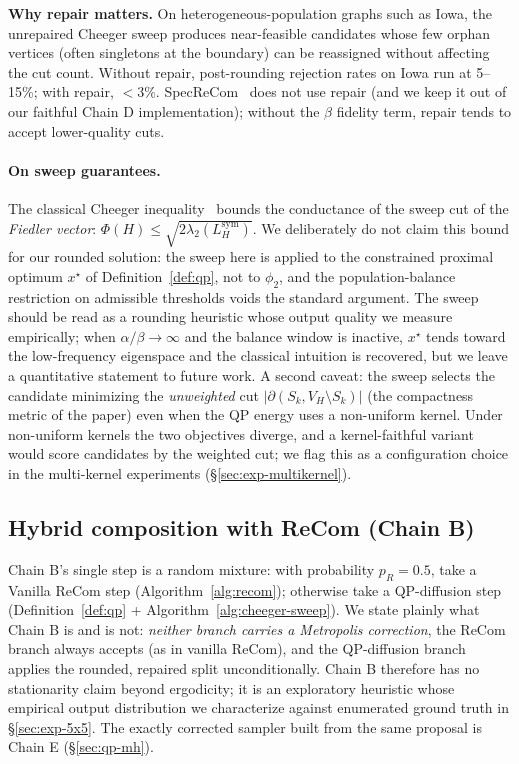 \documentclass[11pt]{article}
\begin{document}
\textbf{Why repair matters.} On heterogeneous-population graphs such
as Iowa, the unrepaired Cheeger sweep produces near-feasible
candidates whose few orphan vertices (often singletons at the
boundary) can be reassigned without affecting the cut count.
Without repair, post-rounding rejection rates on Iowa run at 5--15\%;
with repair, $<3\%$. SpecReCom~\cite{davies2025spectral} does not use
repair (and we keep it out of our faithful Chain D
implementation); without the $\beta$ fidelity term, repair tends to
accept lower-quality cuts.

\paragraph{On sweep guarantees.} The classical Cheeger
inequality~\cite{kelner2009spectral} bounds the conductance of the
sweep cut of the \emph{Fiedler vector}:
$\Phi(H) \le \sqrt{2 \lambda_2(L_H^{\mathrm{sym}})}$. We deliberately
do not claim this bound for our rounded solution: the sweep here is
applied to the constrained proximal optimum $x^\star$ of
Definition~\ref{def:qp}, not to $\phi_2$, and the population-balance
restriction on admissible thresholds voids the standard argument. The
sweep should be read as a rounding heuristic whose output quality we
measure empirically; when $\alpha/\beta \to \infty$ and the balance
window is inactive, $x^\star$ tends toward the low-frequency eigenspace
and the classical intuition is recovered, but we leave a quantitative
statement to future work. A second caveat: the sweep selects the
candidate minimizing the \emph{unweighted} cut $|\partial(S_k, V_H
\setminus S_k)|$ (the compactness metric of the paper) even when
the QP energy uses a non-uniform kernel. Under non-uniform kernels the
two objectives diverge, and a kernel-faithful variant would score
candidates by the weighted cut; we flag this as a configuration choice
in the multi-kernel experiments (\S\ref{sec:exp-multikernel}).

\subsection{Hybrid composition with ReCom (Chain B)}\label{sec:hybrid-mh}

Chain B's single step is a random mixture: with probability
$p_R = 0.5$, take a Vanilla ReCom step (Algorithm~\ref{alg:recom});
otherwise take a QP-diffusion step (Definition~\ref{def:qp} +
Algorithm~\ref{alg:cheeger-sweep}). We state plainly what Chain B is
and is not: \emph{neither branch carries a Metropolis correction}, the ReCom branch always accepts (as in vanilla ReCom), and the
QP-diffusion branch applies the rounded, repaired split
unconditionally. Chain B therefore has no stationarity claim beyond
ergodicity; it is an exploratory heuristic whose empirical output
distribution we characterize against enumerated ground truth in
\S\ref{sec:exp-5x5}. The exactly corrected sampler built from the same
proposal is Chain E (\S\ref{sec:qp-mh}).
\end{document}

